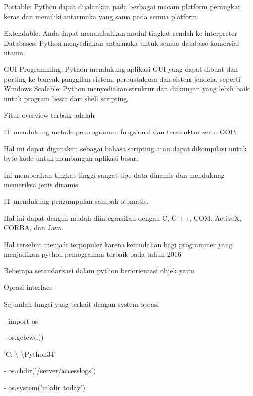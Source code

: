 \noindent 
Portable: Python dapat dijalankan pada berbagai macam platform perangkat keras dan memiliki antarmuka yang sama pada semua platform. \par
\noindent 
Extendable: Anda dapat menambahkan modul tingkat rendah ke interpreter Databases: Python menyediakan antarmuka untuk semua database komersial utama. \par
\noindent 
GUI Programming: Python mendukung aplikasi GUI yang dapat dibuat dan porting ke banyak panggilan sistem, perpustakaan dan sistem jendela, seperti Windows Scalable: Python menyediakan struktur dan dukungan yang lebih baik untuk program besar dari shell scripting. \par
\vspace{12pt}
\noindent 
Fitur overview terbaik adalah  \par
\noindent 
IT mendukung metode pemrograman fungsional dan terstruktur serta OOP. \par
\noindent 
Hal ini dapat digunakan sebagai bahasa scripting atau dapat dikompilasi untuk byte-kode untuk membangun aplikasi besar. \par
\noindent 
Ini memberikan tingkat tinggi sangat tipe data dinamis dan mendukung memeriksa jenis dinamis. \par
\noindent 
IT mendukung pengumpulan sampah otomatis. \par
\noindent 
Hal ini dapat dengan mudah diintegrasikan dengan C, C ++, COM, ActiveX, CORBA, dan Java. \par
\noindent 
Hal tersebut menjadi terpopuler karena kemudahan bagi programmer yang menjadikan python pemograman terbaik pada tahun 2016  \par
\noindent 
Beberapa setandarisasi dalam python beriorientasi objek yaitu \par
\noindent 
Oprasi interface \par
\noindent 
Sejumlah fungsi yang terkait dengan system oprasi \par
\noindent 
- import os \par
\vspace{12pt}
\noindent 
- os.getcwd()~~~~~  \par
\noindent 
'C: $  \setminus  $ $  \setminus  $Python34' \par
\vspace{12pt}
\noindent 
- os.chdir('/server/accesslogs') \par
\vspace{12pt}
\noindent 
- os.system('mkdir~today')~   \par
